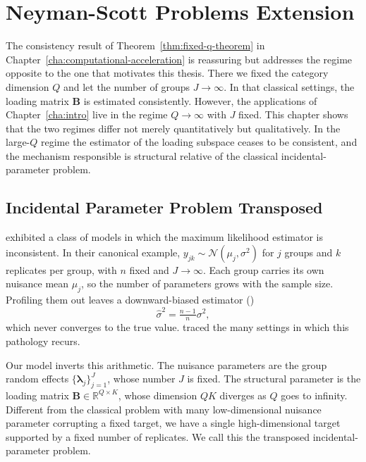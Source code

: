 \chapter{Neyman-Scott Problems Extension}
\label{cha:neyman-scott}

The consistency result of Theorem~\ref{thm:fixed-q-theorem} in Chapter~\ref{cha:computational-acceleration} is reassuring but addresses the regime opposite to the one that motivates this thesis. There we fixed the category dimension $Q$ and let the number of groups $J\to\infty$. In that classical settings, the loading matrix $\mathbf{B}$ is estimated consistently. However, the applications of Chapter~\ref{cha:intro} live in the regime $Q\to\infty$ with $J$ fixed. This chapter shows that the two regimes differ not merely quantitatively but qualitatively. In the large-$Q$ regime the estimator of the loading subspace ceases to be consistent, and the mechanism responsible is structural relative of the classical incidental-parameter problem.

\section{Incidental Parameter Problem Transposed}
\citet{https://www.jstor.org/stable/1914288} exhibited a class of models in which the maximum likelihood estimator is inconsistent. In their canonical example, $y_{jk}\sim \mathcal{N}(\mu_{j},\sigma^{2})$ for $j$ groups and $k$ replicates per group, with $n$ fixed and $J\to\infty$. Each group carries its own nuisance mean $\mu_{j}$, so the number of parameters grows with the sample size. Profiling them out leaves a downward-biased estimator (\cite{Amari2016}) 
\begin{equation}
    \hat{\sigma}^2 = \tfrac{n-1}{n}\sigma^2,
    \label{eq:downward-biased-estimator}
\end{equation}
which never converges to the true value. \citet{LANCASTER2000391} traced the many settings in which this pathology recurs. 

Our model inverts this arithmetic. The nuisance parameters are the group random effects  $\{\bm{\lambda}_j\}_{j=1}^{J}$, whose number $J$ is fixed. The structural parameter is the loading matrix $\mathbf{B} \in \mathbb{R}^{Q\times K}$, whose dimension $QK$ diverges as $Q$ goes to infinity. Different from the classical problem with many low-dimensional nuisance parameter corrupting a fixed target, we have a single high-dimensional target supported by a fixed number of replicates. We call this the transposed incidental-parameter problem.

